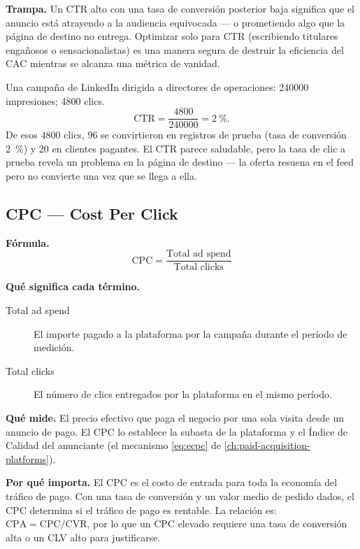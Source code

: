 \textbf{Trampa.} Un CTR alto con una tasa de conversión posterior baja significa que el
anuncio está atrayendo a la audiencia equivocada --- o prometiendo algo que la página de
destino no entrega. Optimizar solo para CTR (escribiendo titulares engañosos o
sensacionalistas) es una manera segura de destruir la eficiencia del CAC mientras se alcanza
una métrica de vanidad.

\begin{example}
Una campaña de LinkedIn dirigida a directores de operaciones: \num{240000} impresiones;
\num{4800} clics.
\[
  \mathrm{CTR} = \frac{4800}{240000} = \qty{2}{\percent}.
\]
De esos \num{4800} clics, \num{96} se convirtieron en registros de prueba (tasa de conversión
\qty{2}{\percent}) y \num{20} en clientes pagantes. El CTR parece saludable, pero la tasa
de clic a prueba revela un problema en la página de destino --- la oferta resuena en el
feed pero no convierte una vez que se llega a ella.
\end{example}


\subsection{CPC --- Cost Per Click}

\textbf{Fórmula.}
\[
  \mathrm{CPC} = \frac{\text{Total ad spend}}{\text{Total clicks}}
\]

\textbf{Qué significa cada término.}
\begin{description}
  \item[Total ad spend] El importe pagado a la plataforma por la campaña durante el período
    de medición.
  \item[Total clicks] El número de clics entregados por la plataforma en el mismo período.
\end{description}

\textbf{Qué mide.} El precio efectivo que paga el negocio por una sola visita desde un
anuncio de pago. El CPC lo establece la subasta de la plataforma y el Índice de Calidad del
anunciante (el mecanismo \cref{eq:ecpc} de \cref{ch:paid-acquisition-platforms}).

\textbf{Por qué importa.} El CPC es el costo de entrada para toda la economía del tráfico
de pago. Con una tasa de conversión y un valor medio de pedido dados, el CPC determina si
el tráfico de pago es rentable. La relación es: $\mathrm{CPA} = \mathrm{CPC} /
\mathrm{CVR}$, por lo que un CPC elevado requiere una tasa de conversión alta o un CLV alto
para justificarse.

